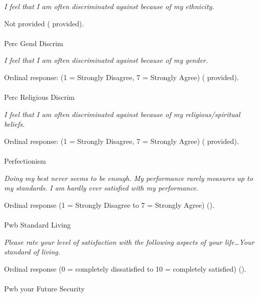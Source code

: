 \documentclass[
  single column]{article}
\makeatletter
\let\oldparagraph\paragraph
\renewcommand{\paragraph}{
    \@ifstar
      \xxxParagraphStar
      \xxxParagraphNoStar
  }
\newcommand{\xxxParagraphStar}[1]{\oldparagraph*{#1}\mbox{}}
\newcommand{\xxxParagraphNoStar}[1]{\oldparagraph{#1}\mbox{}}
\makeatother
\begin{document}
\emph{I feel that I am often discriminated against because of my
ethnicity.}

Not provided ( provided).

\paragraph{Perc Gend Discrim}\label{perc-gend-discrim}

\emph{I feel that I am often discriminated against because of my
gender.}

Ordinal response: (1 = Strongly Disagree, 7 = Strongly Agree)
( provided).

\paragraph{Perc Religious Discrim}\label{perc-religious-discrim}

\emph{I feel that I am often discriminated against because of my
religious/spiritual beliefs.}

Ordinal response: (1 = Strongly Disagree, 7 = Strongly Agree)
( provided).

\paragraph{Perfectionism}\label{perfectionism-1}

\emph{Doing my best never seems to be enough.} \emph{My performance
rarely measures up to my standards.} \emph{I am hardly ever satisfied
with my performance.}

Ordinal response (1 = Strongly Disagree to 7 = Strongly Agree)
().

\paragraph{Pwb Standard Living}\label{pwb-standard-living}

\emph{Please rate your level of satisfaction with the following aspects
of your life\ldots Your standard of living.}

Ordinal response (0 = completely dissatisfied to 10 = completely
satisfied) ().

\paragraph{Pwb your Future Security}\label{pwb-your-future-security}
\end{document}
